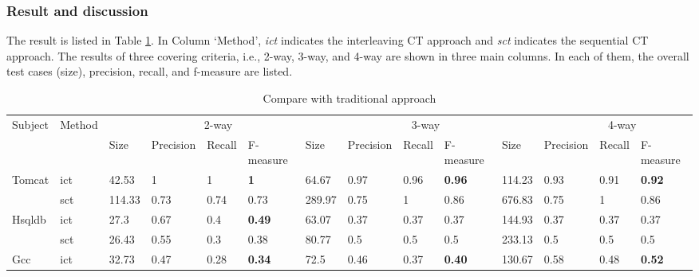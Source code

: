 \documentclass{sig-alternate}
\begin{document}
\subsubsection{Result and discussion}

The result is listed in Table \ref{cm_elda_fglt}. In Column `Method', \emph{ict} indicates the interleaving CT approach and \emph{sct} indicates the sequential CT approach. The results of three covering criteria, i.e., 2-way, 3-way, and 4-way are shown in three main columns. In each of them, the overall test cases (size), precision, recall, and f-measure are listed.

\begin{table}[htbp]
\center
\caption{Compare with traditional approach}
\label{cm_elda_fglt}
\setlength{\tabcolsep}{3pt}
\begin{tabular}{|ll|llll|llll|llll|}
\hline
\multirow{2}{*}{Subject} & \multirow{2}{*}{Method} & \multicolumn{4}{l|}{\ \ \ \ \ \ \ \ \ \ \ \ \ \ \ \ \ 2-way}            & \multicolumn{4}{l|}{\ \ \ \ \ \ \ \ \ \ \ \ \ \ \ \ \ \ \ 3-way}            & \multicolumn{4}{l|}{\ \ \ \ \ \ \ \ \ \ \ \ \ \ \ \ \ \ \ 4-way}               \\ \cline{3-14}
                         &                         & Size   & Precision & Recall & F-measure & Size   & Precision & Recall & F-measure & Size    & Precision & Recall & F-measure   \\ \hline
Tomcat                   & ict                    & 42.53   & 1    & 1    & \textbf{1}      &  64.67  &0.97    & 0.96   & \textbf{0.96}      & 114.23 &  0.93    &  0.91   &  \textbf{0.92 }       \\
                         & sct                    & 114.33  & 0.73    & 0.74    & 0.73      & 289.97  & 0.75     & 1    & 0.86       & 676.83  & 0.75     & 1    & 0.86         \\ \hline
Hsqldb                   & ict                    & 27.3   & 0.67    & 0.4    & \textbf{0.49}      & 63.07  & 0.37    & 0.37   & 0.37      & 144.93  & 0.37    & 0.37   & 0.37        \\
                         & sct                    & 26.43  & 0.55    & 0.3    & 0.38      & 80.77  & 0.5     & 0.5    & 0.5       & 233.13  & 0.5     & 0.5    & 0.5         \\ \hline
Gcc                      & ict                    & 32.73   & 0.47    & 0.28   & \textbf{0.34 }     & 72.5   & 0.46    & 0.37   &\textbf{ 0.40}      & 130.67  & 0.58    & 0.48  &\textbf{ 0.52 }       \\

\end{tabular}
\end{table}
\end{document}
